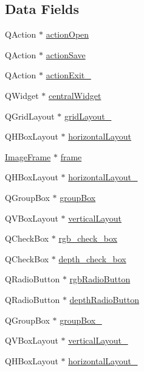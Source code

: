 \subsection*{Data Fields}
\begin{DoxyCompactItemize}
\item 
QAction $\ast$ \hyperlink{classUi__Gui_a92b3eb1d5cac58fdea100712a6350bfa}{actionOpen}
\item 
QAction $\ast$ \hyperlink{classUi__Gui_a3c6e08973ab015f9504e13db7bb617ea}{actionSave}
\item 
QAction $\ast$ \hyperlink{classUi__Gui_a6f7e1eee8cfb033020932a1e347fcab7}{actionExit\_}
\item 
QWidget $\ast$ \hyperlink{classUi__Gui_a06f615058bbc7a53092971485610646c}{centralWidget}
\item 
QGridLayout $\ast$ \hyperlink{classUi__Gui_afa1d273753f4848f9b6625c81fb13d7f}{gridLayout\_}
\item 
QHBoxLayout $\ast$ \hyperlink{classUi__Gui_a36db684cb7cac72ebfc34ded592caf2f}{horizontalLayout}
\item 
\hyperlink{classImageFrame}{ImageFrame} $\ast$ \hyperlink{classUi__Gui_abd3574b36c218e51e56354b5336ab146}{frame}
\item 
QHBoxLayout $\ast$ \hyperlink{classUi__Gui_ae2bdd41ec56288784341356571951a2f}{horizontalLayout\_}
\item 
QGroupBox $\ast$ \hyperlink{classUi__Gui_ae972e63a61b86d36c9613f1347b1a0b7}{groupBox}
\item 
QVBoxLayout $\ast$ \hyperlink{classUi__Gui_af68993febd8983e57c8a2d590f82f6f4}{verticalLayout}
\item 
QCheckBox $\ast$ \hyperlink{classUi__Gui_a7966c402c7480aea21beefdedb9ff975}{rgb\_\-check\_\-box}
\item 
QCheckBox $\ast$ \hyperlink{classUi__Gui_acefd050dfe993330f502e10660be3fe0}{depth\_\-check\_\-box}
\item 
QRadioButton $\ast$ \hyperlink{classUi__Gui_a4f5eedc4bd54e2bede4a49f492ed1002}{rgbRadioButton}
\item 
QRadioButton $\ast$ \hyperlink{classUi__Gui_a700c0982fcedc0bc21592250f8880bfc}{depthRadioButton}
\item 
QGroupBox $\ast$ \hyperlink{classUi__Gui_acaa7d078b7476294ec0b8435a0729d8c}{groupBox\_}
\item 
QVBoxLayout $\ast$ \hyperlink{classUi__Gui_a7c6c89e18b906d464244b3978605b4ad}{verticalLayout\_}
\item 
QHBoxLayout $\ast$ \hyperlink{classUi__Gui_a28cdfdb260fa90da1b1423d8d73558c0}{horizontalLayout\_}

\end{DoxyCompactItemize}

